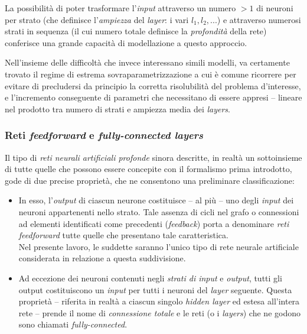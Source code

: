 \documentclass[a4paper, twoside]{article}
\begin{document}
La possibilità di poter trasformare l'\textit{input} attraverso un numero $>1$ di neuroni per strato (che definisce l'\textit{ampiezza} del \textit{layer}: i vari $l_1, l_2, ...$) e attraverso numerosi strati in sequenza (il cui numero totale definisce la \textit{profondità} della rete) conferisce una grande capacità di modellazione a questo approccio.

Nell'insieme delle difficoltà che invece interessano simili modelli, va certamente trovato il regime di estrema sovraparametrizzazione a cui è comune ricorrere per evitare di precludersi da principio la corretta risolubilità del problema d'interesse, e l'incremento conseguente di parametri che necessitano di essere appresi -- lineare nel prodotto tra numero di strati e ampiezza media dei \textit{layers}.


\subsubsection{Reti \textit{feedforward} e \textit{fully-connected layers}}

Il tipo di \textit{reti neurali artificiali profonde} sinora descritte, in realtà un sottoinsieme di tutte quelle che possono essere concepite con il formalismo prima introdotto, gode di due precise proprietà, che ne consentono una preliminare classificazione:

\begin{itemize}
	\item {In esso, l'\textit{output} di ciascun neurone costituisce -- al più -- uno degli \textit{input} dei neuroni appartenenti nello strato. Tale assenza di cicli nel grafo o connessioni ad elementi identificati come precedenti (\textit{feedback}) porta a denominare \textit{reti feedforward} tutte quelle che presentano tale caratteristica.\\
	Nel presente lavoro, le suddette saranno l'unico tipo di rete neurale artificiale considerata in relazione a questa suddivisione.}
	\item {Ad eccezione dei neuroni contenuti negli \textit{strati di input} e \textit{output}, tutti gli output costituiscono un \textit{input} per tutti i neuroni del \textit{layer} seguente. Questa proprietà -- riferita in realtà a ciascun singolo \textit{hidden layer} ed estesa all'intera rete -- prende il nome di \textit{connessione totale} e le reti (o i \textit{layers}) che ne godono sono chiamati \textit{fully-connected}}.
\end{itemize}
\end{document}

